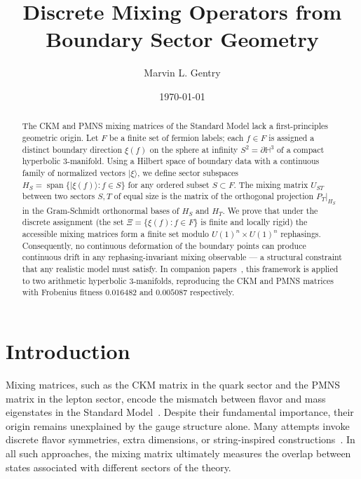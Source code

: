 \documentclass[11pt,a4paper]{article}
\begin{document}
\title{Discrete Mixing Operators from Boundary Sector Geometry}
\author[1]{Marvin L. Gentry}
\date{\today}
\maketitle

\begin{abstract}
The CKM and PMNS mixing matrices of the Standard Model lack a
first-principles geometric origin.
Let $F$ be a finite set of fermion labels; each $f\in F$ is assigned
a distinct boundary direction $\xi(f)$ on the sphere at infinity
$S^2=\partial\mathbb{H}^3$ of a compact hyperbolic 3-manifold.
Using a Hilbert space of boundary data with a continuous family of
normalized vectors $|\xi\rangle$, we define sector subspaces
$H_S=\operatorname{span}\{|\xi(f)\rangle:f\in S\}$ for any ordered
subset $S\subset F$.
The mixing matrix $U_{ST}$ between two sectors $S,T$ of equal size
is the matrix of the orthogonal projection $P_T|_{H_S}$ in the
Gram-Schmidt orthonormal bases of $H_S$ and $H_T$.
We prove that under the discrete assignment (the set
$\Xi=\{\xi(f):f\in F\}$ is finite and locally rigid) the accessible
mixing matrices form a finite set modulo
$U(1)^n\times U(1)^n$ rephasings.
Consequently, no continuous deformation of the boundary points can
produce continuous drift in any rephasing-invariant mixing observable
--- a structural constraint that any realistic model must satisfy.
In companion papers~\cite{Gentry:CKM,Gentry:PMNS}, this framework
is applied to two arithmetic hyperbolic 3-manifolds, reproducing the
CKM and PMNS matrices with Frobenius fitness $0.016482$ and
$0.005087$ respectively.
\end{abstract}

\section{Introduction}

Mixing matrices, such as the CKM matrix in the quark sector and the
PMNS matrix in the lepton sector, encode the mismatch between flavor
and mass eigenstates in the Standard Model~\cite{PDG}.
Despite their fundamental importance, their origin remains unexplained
by the gauge structure alone.
Many attempts invoke discrete flavor symmetries, extra dimensions, or
string-inspired constructions~\cite{AltarelliFeruglio,KingLuhn}.
In all such approaches, the mixing matrix ultimately measures the
overlap between states associated with different sectors of the theory.
\end{document}
